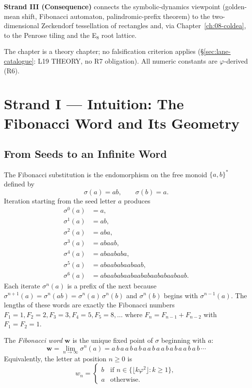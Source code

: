\textbf{Strand III (Consequence)} connects the symbolic-dynamics
viewpoint (golden-mean shift, Fibonacci automaton, palindromic-prefix
theorem) to the two-dimensional Zeckendorf tessellation of rectangles
and, via Chapter~\ref{ch:08-coldea}, to the Penrose tiling and the
E\(_8\) root lattice.

The chapter is a theory chapter; no falsification criterion applies
(\S\ref{sec:lane-catalogue}: L19 THEORY, no R7 obligation).
All numeric constants are \(\varphi\)-derived (R6).

\section{Strand I --- Intuition: The Fibonacci Word and Its Geometry}
\label{sec:ch19-strand-i}

\subsection{From Seeds to an Infinite Word}
\label{subsec:ch19-seeds}

The Fibonacci substitution is the endomorphism on the free monoid
\(\{a,b\}^*\) defined by
\begin{equation}\label{eq:fib-sub}
  \sigma(a) = ab, \qquad \sigma(b) = a.
\end{equation}
Iteration starting from the seed letter \(a\) produces
\begin{align*}
  \sigma^0(a) &= a,\\
  \sigma^1(a) &= ab,\\
  \sigma^2(a) &= aba,\\
  \sigma^3(a) &= abaab,\\
  \sigma^4(a) &= abaababa,\\
  \sigma^5(a) &= abaababaabaab,\\
  \sigma^6(a) &= abaababaabaababaababaabaab.
\end{align*}
Each iterate \(\sigma^n(a)\) is a prefix of the next because
\(\sigma^{n+1}(a) = \sigma^n(ab) = \sigma^n(a)\,\sigma^n(b)\) and
\(\sigma^n(b)\) begins with \(\sigma^{n-1}(a)\).  The lengths of
these words are exactly the Fibonacci numbers
\(F_1=1, F_2=2, F_3=3, F_4=5, F_5=8, \ldots\) where
\(F_n = F_{n-1}+F_{n-2}\) with \(F_1=F_2=1\).

\begin{definition}\label{def:fib-word}
  The \emph{Fibonacci word} \(\mathbf{w}\) is the unique fixed point
  of \(\sigma\) beginning with \(a\):
  \[
    \mathbf{w} = \lim_{n\to\infty} \sigma^n(a)
    = a\,b\,a\,a\,b\,a\,b\,a\,a\,b\,a\,a\,b\,a\,b\,a\,a\,b\,a\,b\,\cdots
  \]
  Equivalently, the letter at position \(n\geq 0\) is
  \begin{equation}\label{eq:fib-word-beatty}
    w_n =
    \begin{cases}
      b & \text{if } n \in \bigl\{\lfloor k\varphi^2 \rfloor : k\geq 1\bigr\},\\
      a & \text{otherwise.}
    \end{cases}
  \end{equation}
\end{definition}

